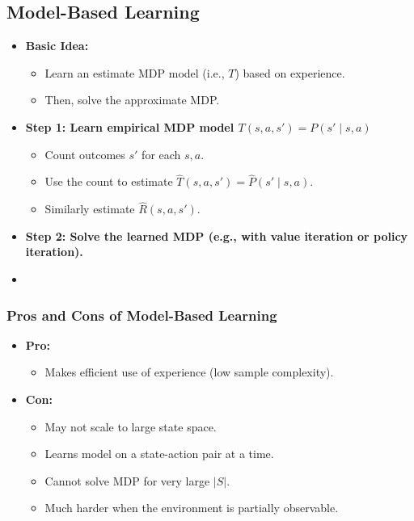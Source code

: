 \subsection{Model-Based Learning}
\begin{definition}
    \begin{itemize}
        \item \textbf{Basic Idea:}
        \begin{itemize}
            \item Learn an estimate MDP model (i.e., $T$) based on experience.
            \item Then, solve the approximate MDP.
        \end{itemize}
        \item \textbf{Step 1: Learn empirical MDP model $T(s,a,s') = P(s' \mid s,a)$}
        \begin{itemize}
            \item Count outcomes $s'$ for each $s, a$.
            \item Use the count to estimate $\hat{T}(s,a,s') = \hat{P}(s' \mid s,a)$.
            \item Similarly estimate $\hat{R}(s,a,s')$.
        \end{itemize}
        \item \textbf{Step 2: Solve the learned MDP (e.g., with value iteration or policy iteration).}
    \end{itemize}
\end{definition}

\begin{example}
    \begin{itemize}
        \item 
    \end{itemize}
\end{example}

\subsubsection{Pros and Cons of Model-Based Learning}
\begin{intuition} 
    \begin{itemize}
        \item \textbf{Pro:}
        \begin{itemize}
            \item Makes efficient use of experience (low sample complexity).
        \end{itemize}
        \item \textbf{Con:}
        \begin{itemize}
            \item May not scale to large state space.
            \item Learns model on a state-action pair at a time.
            \item Cannot solve MDP for very large $\vert S \vert$.
            \item Much harder when the environment is partially observable.
        \end{itemize}
    \end{itemize}
\end{intuition}

